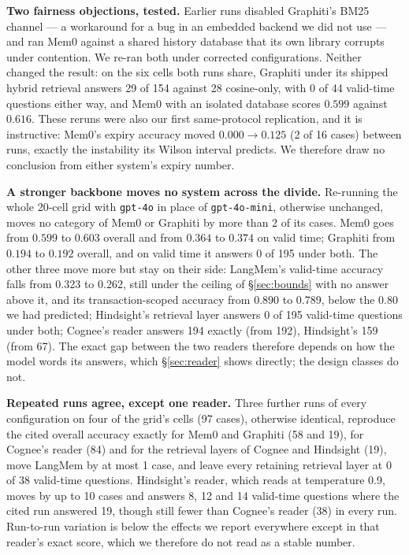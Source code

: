 \documentclass[conference]{IEEEtran}
\begin{document}
\textbf{Two fairness objections, tested.} Earlier runs disabled Graphiti's BM25
channel --- a workaround for a bug in an embedded backend we did not use --- and
ran Mem0 against a shared history database that its own library corrupts under
contention. We re-ran both under corrected configurations. Neither changed the
result: on the six cells both runs share, Graphiti under its shipped hybrid
retrieval answers 29 of 154 against 28 cosine-only, with 0 of 44 valid-time
questions either way, and Mem0 with an isolated database scores $0.599$ against
$0.616$. These reruns were also our
first same-protocol replication, and it is instructive: Mem0's expiry accuracy
moved $0.000 \to 0.125$ (2 of 16 cases) between runs, exactly the instability its
Wilson interval predicts. We therefore draw no conclusion from either system's
expiry number.

\textbf{A stronger backbone moves no system across the divide.} Re-running the
whole 20-cell grid with \texttt{gpt-4o} in place of \texttt{gpt-4o-mini},
otherwise unchanged, moves no category of Mem0 or Graphiti by more than 2 of its
cases. Mem0 goes from $0.599$ to $0.603$ overall and from $0.364$ to $0.374$ on
valid time; Graphiti from $0.194$ to $0.192$ overall, and on valid time it
answers 0 of 195 under both. The other three move more but stay on their side:
LangMem's valid-time accuracy falls from 0.323 to 0.262, still under the ceiling
of \S\ref{sec:bounds} with no answer above it, and its transaction-scoped
accuracy from 0.890 to 0.789, below the 0.80 we had predicted; Hindsight's
retrieval layer answers 0 of 195 valid-time questions under both; Cognee's
reader answers 194 exactly (from 192), Hindsight's 159 (from 67). The exact gap
between the two readers therefore depends on how the model words its answers,
which \S\ref{sec:reader} shows directly; the design classes do not.

\textbf{Repeated runs agree, except one reader.} Three further runs of every
configuration on four of the grid's cells (97 cases), otherwise identical,
reproduce the cited overall accuracy exactly for Mem0 and Graphiti (58 and 19),
for Cognee's reader (84) and for the retrieval layers of Cognee and Hindsight
(19), move LangMem by at most 1 case, and leave every retaining retrieval layer
at 0 of 38 valid-time questions. Hindsight's reader, which reads at temperature 0.9, moves
by up to 10 cases and answers 8, 12 and 14 valid-time questions where the cited
run answered 19, though still fewer than Cognee's reader (38) in every run.
Run-to-run variation is below the effects we report everywhere except in that
reader's exact score, which we therefore do not read as a stable number.
\end{document}
